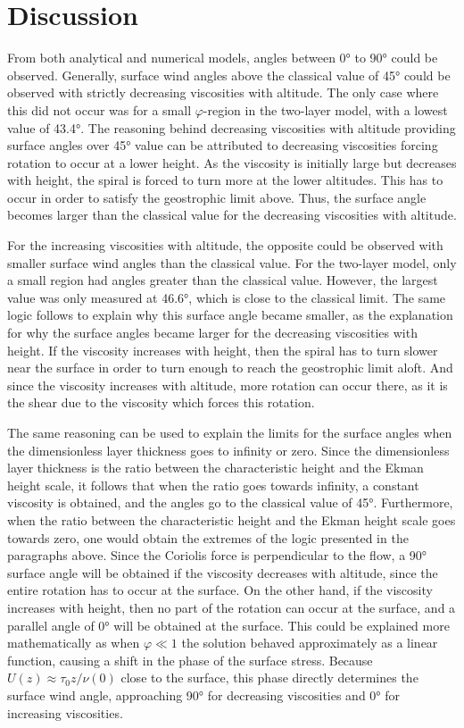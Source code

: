 \section{Discussion}

From both analytical and numerical models, angles between \ang{0} to \ang{90} could be observed. Generally, surface wind angles above the classical value of \ang{45} could be observed with strictly decreasing viscosities with altitude. The only case where this did not occur was for a small $\varphi$-region in the two-layer model, with a lowest value of \ang{43.4}. The reasoning behind decreasing viscosities with altitude providing surface angles over \ang{45} value can be attributed to decreasing viscosities forcing rotation to occur at a lower height. As the viscosity is initially large but decreases with height, the spiral is forced to turn more at the lower altitudes. This has to occur in order to satisfy the geostrophic limit above. Thus, the surface angle becomes larger than the classical value for the decreasing viscosities with altitude.

For the increasing viscosities with altitude, the opposite could be observed with smaller surface wind angles than the classical value. For the two-layer model, only a small region had angles greater than the classical value. However, the largest value was only measured at \ang{46.6}, which is close to the classical limit. The same logic follows to explain why this surface angle became smaller, as the explanation for why the surface angles became larger for the decreasing viscosities with height. If the viscosity increases with height, then the spiral has to turn slower near the surface in order to turn enough to reach the geostrophic limit aloft. And since the viscosity increases with altitude, more rotation can occur there, as it is the shear due to the viscosity which forces this rotation. 

The same reasoning can be used to explain the limits for the surface angles when the dimensionless layer thickness goes to infinity or zero. Since the dimensionless layer thickness is the ratio between the characteristic height and the Ekman height scale, it follows that when the ratio goes towards infinity, a constant viscosity is obtained, and the angles go to the classical value of \ang{45}. Furthermore, when the ratio between the characteristic height and the Ekman height scale goes towards zero, one would obtain the extremes of the logic presented in the paragraphs above. Since the Coriolis force is perpendicular to the flow, a \ang{90} surface angle will be obtained if the viscosity decreases with altitude, since the entire rotation has to occur at the surface. On the other hand, if the viscosity increases with height, then no part of the rotation can occur at the surface, and a parallel angle of \ang{0} will be obtained at the surface. This could be explained more mathematically as when $\varphi \ll 1$ the solution behaved approximately as a linear function, causing a shift in the phase of the surface stress. Because $U(z)\approx \tau_0 z/\nu(0)$ close to the surface, this phase directly determines the surface wind angle, approaching \ang{90} for decreasing viscosities and \ang{0} for increasing viscosities.


